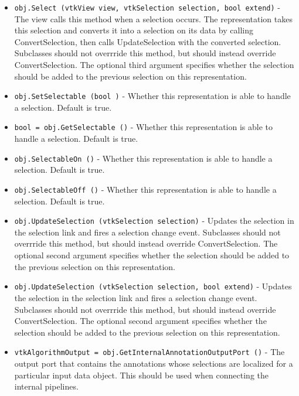 \begin{itemize}
\item  \verb|obj.Select (vtkView view, vtkSelection selection, bool extend)| -  The view calls this method when a selection occurs.
 The representation takes this selection and converts it into
 a selection on its data by calling ConvertSelection,
 then calls UpdateSelection with the converted selection.
 Subclasses should not overrride this method, but should instead
 override ConvertSelection.
 The optional third argument specifies whether the selection should be
 added to the previous selection on this representation.

\item  \verb|obj.SetSelectable (bool )| -  Whether this representation is able to handle a selection.
 Default is true.

\item  \verb|bool = obj.GetSelectable ()| -  Whether this representation is able to handle a selection.
 Default is true.

\item  \verb|obj.SelectableOn ()| -  Whether this representation is able to handle a selection.
 Default is true.

\item  \verb|obj.SelectableOff ()| -  Whether this representation is able to handle a selection.
 Default is true.

\item  \verb|obj.UpdateSelection (vtkSelection selection)| -  Updates the selection in the selection link and fires a selection
 change event. Subclasses should not overrride this method,
 but should instead override ConvertSelection.
 The optional second argument specifies whether the selection should be
 added to the previous selection on this representation.

\item  \verb|obj.UpdateSelection (vtkSelection selection, bool extend)| -  Updates the selection in the selection link and fires a selection
 change event. Subclasses should not overrride this method,
 but should instead override ConvertSelection.
 The optional second argument specifies whether the selection should be
 added to the previous selection on this representation.

\item  \verb|vtkAlgorithmOutput = obj.GetInternalAnnotationOutputPort ()| -  The output port that contains the annotations whose selections are
 localized for a particular input data object.
 This should be used when connecting the internal pipelines.


\end{itemize}
